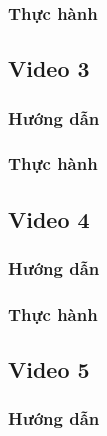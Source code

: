 \documentclass{article}
\begin{document}








\subsubsection{Thực hành}




\newpage
\subsection{Video 3}
\subsubsection{Hướng dẫn}

\subsubsection{Thực hành}




\newpage
\subsection{Video 4}
\subsubsection{Hướng dẫn}

\subsubsection{Thực hành}




\newpage
\subsection{Video 5}
\subsubsection{Hướng dẫn}
\end{document}

